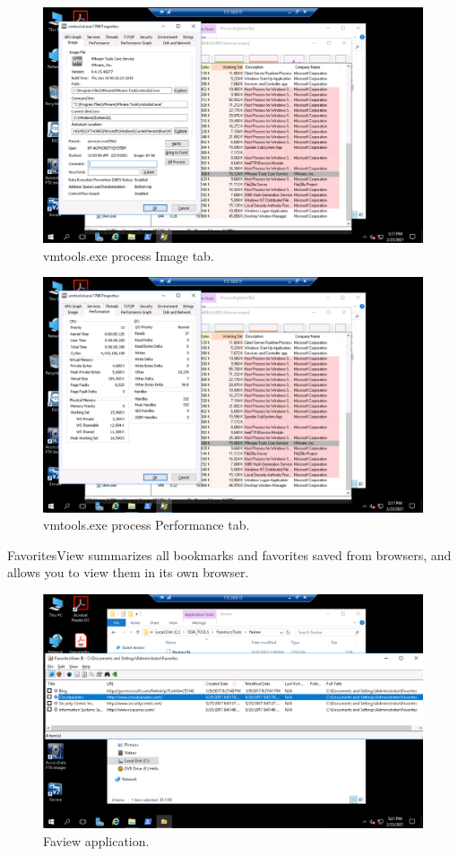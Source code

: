 \begin{figure}[H]
    \centering
    \includegraphics[width=\linewidth]{figures/Part 2 Step 3 Image.png}
    \caption{vmtools.exe process Image tab.}
\end{figure}

\begin{figure}[H]
    \centering
    \includegraphics[width=\linewidth]{figures/Part 2 Step 3 Performance.png}
    \caption{vmtools.exe process Performance tab.}
\end{figure}

FavoritesView summarizes all bookmarks and favorites saved from  browsers, and allows you to view them in its own browser.
\begin{figure}[H]
    \centering
    \includegraphics[width=\linewidth]{figures/Part 2 Step 6.png}
    \caption{Faview application.}
\end{figure}

